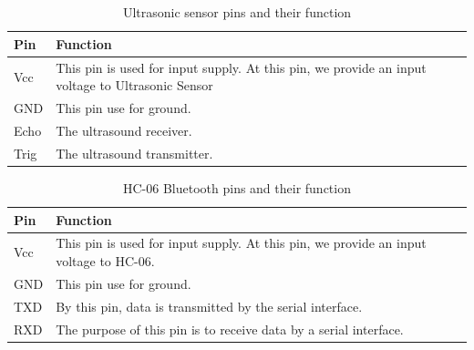 \documentclass[12pt,a4paper]{report}
\begin{document}
\subsection{\fontsize{12}{12}\selectfont{ System connections using the proteus simulator.}}
\begin{table}[H]
\begin{center}
\caption{Ultrasonic sensor pins and their function}
\label{tab:Table1}  
\begin{tabular}{|p{3cm}|p{11cm}|}
\hline
\textbf{Pin} & \textbf{Function}\\
\hline
Vcc &	This pin is used for input supply.
 At this pin, we provide an input voltage to Ultrasonic Sensor\\\hline

GND &This pin use for ground.\\\hline

Echo	 & The ultrasound receiver.\\\hline

Trig	 &The ultrasound transmitter. \\\hline 

\end{tabular}
\end{center}  
\end{table}
\begin{table}[H]
\begin{center}
\caption{HC-06 Bluetooth pins and their function}
\label{tab:Table1}  
\begin{tabular}{|p{3cm}|p{11cm}|}
\hline
\textbf{Pin} & \textbf{Function}\\
\hline
Vcc	&This pin is used for input supply. At this pin, we provide an input voltage to HC-06.\\\hline

GND &This pin use for ground.\\\hline

TXD	&By this pin, data is transmitted by the serial interface.\\\hline

RXD	&The purpose of this pin is to receive data by a serial interface. \\\hline 
\end{tabular}
\end{center}  
\end{table}
\end{document}
